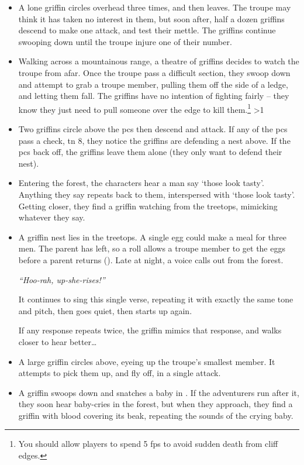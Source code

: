 \begin{multicols}{2}
\showEnc

\begin{itemize}
  \item
  A lone griffin circles overhead three times, and then leaves.
  The troupe may think it has taken no interest in them, but soon after, half a dozen griffins descend to make one attack, and test their mettle.
  The griffins continue swooping down until the troupe injure one of their number.
  \item
  Walking across a mountainous range, a theatre of griffins decides to watch the troupe from afar.
  Once the troupe pass a difficult section, they swoop down and attempt to grab a troupe member, pulling them off the side of a ledge, and letting them fall.
  The griffins have no intention of fighting fairly -- they know they just need to pull someone over the edge to kill them.\footnote{You should allow players to spend 5 \glspl{fp} to avoid sudden death from cliff edges.}
  \ifnum\value{temperature}>1
    \item
    Two griffins circle above the \glspl{pc} then descend and attack.
    If any of the \glspl{pc} pass a  check, \gls{tn} 8, they notice the griffins are defending a nest above.
    If the \glspl{pc} back off, the griffins leave them alone (they only want to defend their nest).
  \else
    \item
    Entering the forest, the characters hear a man say `those look tasty'.
    Anything they say repeats back to them, interspersed with `those look tasty'.
    Getting closer, they find a griffin watching from the treetops, mimicking whatever they say.
  \fi
  \item
  \ifodd\value{r4}
    A griffin nest lies in the treetops.
    A single egg could make a meal for three men.
    The parent has left, so a  roll allows a troupe member to get the eggs before a parent returns (\tn[9]).
  \else
    Late at night, a voice calls out from the forest.

    \textit{``Hoo-rah, up-she-rises!''}

    It continues to sing this single verse, repeating it with exactly the same tone and pitch, then goes quiet, then starts up again.

    If any response repeats twice, the griffin mimics that response, and walks closer to hear better\ldots
  \fi
  \item
  A large griffin circles above, eyeing up the troupe's smallest member.
  It attempts to pick them up, and fly off, in a single attack.
  \item
  A griffin swoops down and snatches a baby in .
  If the adventurers run after it, they soon hear baby-cries in the forest, but when they approach, they find a griffin with blood covering its beak, repeating the sounds of the crying baby.


\end{itemize}
\end{multicols}
